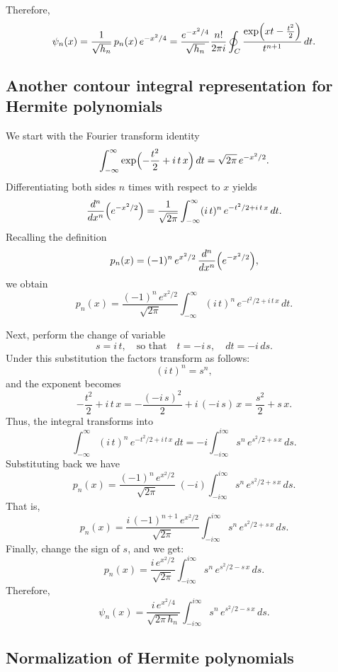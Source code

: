 \documentclass[letterpaper,11pt,oneside,reqno]{article}
\numberwithin{equation}{section}
\theoremstyle{definition}
\begin{document}
Therefore,
\begin{equation*}
	\psi_n(x)=\frac{1}{\sqrt{h_n}}\,p_n(x)\,e^{-x^2/4}=
	\frac{e^{-x^2/4}}{\sqrt{h_n}}\frac{n!}{2\pi i}\oint_C\frac{\exp\Bigl(xt-\frac{t^2}{2}\Bigr)}{t^{n+1}}\,dt.
\end{equation*}

\subsection{Another contour integral representation for Hermite polynomials}

We start with the Fourier transform identity
\[
\int_{-\infty}^{\infty} \exp\Bigl(-\frac{t^2}{2} + i\,t\,x\Bigr)\,dt
=\sqrt{2\pi}\,e^{-x^2/2}.
\]
Differentiating both sides \(n\) times with respect to \(x\) yields
\[
\frac{d^n}{dx^n}\Bigl(e^{-x^2/2}\Bigr)
=\frac{1}{\sqrt{2\pi}}\int_{-\infty}^{\infty} (i\,t)^n\,e^{-t^2/2+ i\,t\,x}\,dt.
\]
Recalling the definition
\[
p_n(x)=(-1)^n\,e^{x^2/2}\,\frac{d^n}{dx^n}\Bigl(e^{-x^2/2}\Bigr),
\]
we obtain
\[
p_n(x)=\frac{(-1)^n\,e^{x^2/2}}{\sqrt{2\pi}}\int_{-\infty}^{\infty}(i\,t)^n\,e^{-t^2/2+ i\,t\,x}\,dt.
\]

Next, perform the change of variable
\[
s=i\,t,\quad\text{so that}\quad t=-i\,s,\quad dt=-i\,ds.
\]
Under this substitution the factors transform as follows:
\[
(i\,t)^n = s^n,
\]
and the exponent becomes
\[
-\frac{t^2}{2}+ i\,t\,x
= -\frac{(-i\,s)^2}{2}+ i\,(-i\,s)\,x
= \frac{s^2}{2}+ s\,x.
\]
Thus, the integral transforms into
\[
\int_{-\infty}^{\infty}(i\,t)^n\,e^{-t^2/2+ i\,t\,x}\,dt
= -i \int_{-i\infty}^{i\infty} s^n\,e^{s^2/2+ s\,x}\,ds.
\]
Substituting back we have
\[
p_n(x)=\frac{(-1)^n\,e^{x^2/2}}{\sqrt{2\pi}}\;(-i)
\int_{-i\infty}^{i\infty} s^n\,e^{s^2/2+ s\,x}\,ds.
\]
That is,
\[
p_n(x)=\frac{i\,(-1)^{n+1}\,e^{x^2/2}}{\sqrt{2\pi}}
\int_{-i\infty}^{i\infty} s^n\,e^{s^2/2+ s\,x}\,ds.
\]
Finally, change the sign of $s$, and we get:
\[
p_n(x)=\frac{i\,e^{x^2/2}}{\sqrt{2\pi}}
\int_{-i\infty}^{i\infty} s^n\,e^{s^2/2- s\,x}\,ds.
\]
Therefore,
\[
\psi_n(x)=\frac{i\,e^{x^2/4}}{\sqrt{2\pi\,h_n}}
\int_{-i\infty}^{i\infty} s^n\,e^{s^2/2- s\,x}\,ds.
\]

\subsection{Normalization of Hermite polynomials}
\end{document}
